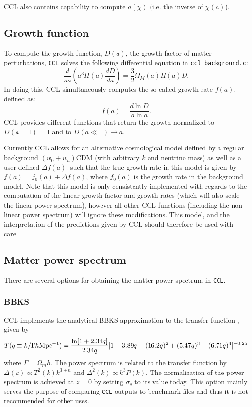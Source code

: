 \documentclass[\docopts]{\docclass}
\begin{document}
CCL also contains capability to compute $a(\chi)$ (i.e. the inverse of $\chi(a)$).


\subsection{Growth function}
\label{sec:growth}
To compute the growth function, $D(a)$, the growth factor of matter perturbations, {\tt CCL} solves the following differential equation in {\tt ccl\_background.c}:
\begin{equation}
  \frac{d}{da}\left(a^3H(a)\frac{dD}{da}\right)=\frac{3}{2}\Omega_M(a)H(a)D.
\end{equation}
In doing this, CCL simultaneously computes the so-called growth rate $f(a)$, defined as:
\begin{equation}
  f(a)=\frac{d\ln D}{d\ln a}.
\end{equation}
CCL provides different functions that return the growth normalized to $D(a=1)=1$ and to $D(a\ll1)\rightarrow a$.

Currently CCL allows for an alternative cosmological model defined by a regular background $(w_0+w_a)$CDM (with arbitrary $k$ and neutrino mass) as well as a user-defined $\Delta f(a)$, such that the true growth rate in this model is given by $f(a)=f_0(a)+\Delta f(a)$, where $f_0(a)$ is the growth rate in the background model. Note that this model is only consistently implemented with regards to the computation of the linear growth factor and growth rates (which will also scale the linear power spectrum), however all other CCL functions (including the non-linear power spectrum) will ignore these modifications. This model, and the interpretation of the predictions given by CCL should therefore be used with care.

\subsection{Matter power spectrum}
\label{sec:power}

There are several options for obtaining the matter power spectrum in {\tt CCL}. 

\subsubsection{BBKS}
CCL implements the analytical BBKS approximation to the transfer function \citep{BBKS}, given by
\begin{equation}
T(q\equiv k/\Gamma h {\rm Mpc}^{-1}) = \frac{\ln[1+2.34q]}{2.34q}[1+3.89q+(16.2q)^2+(5.47q)^3+(6.71q)^4]^{-0.25}
\end{equation}
where $\Gamma = \Omega_m h$.
The power spectrum is related to the transfer function by $\Delta(k)\propto T^2(k)k^{3+n}$ and $\Delta^2(k)\propto k^3P(k)$. The normalization of the power spectrum is achieved at $z=0$ by setting $\sigma_8$ to its value today. This option mainly serves the purpose of comparing {\tt CCL} outputs to benchmark files and thus it is not recommended for other uses. 
\end{document}
